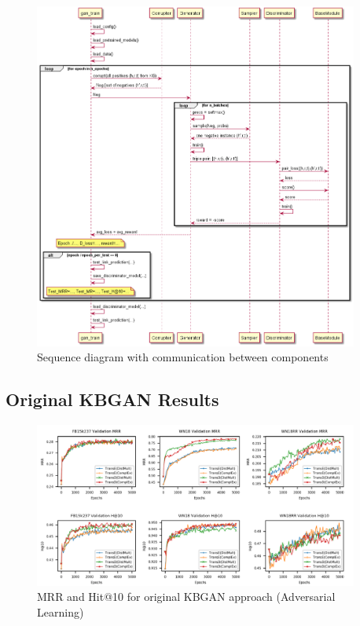 \begin{figure}[t]
  \centering
    \includegraphics[width=0.95\textwidth]{appendices/gan_train_sequencediagram.png}
  \caption{Sequence diagram with communication between components}
  \label{fig:overview}
\end{figure}


\subsection{Original KBGAN Results}
\begin{figure}[t]
  \centering
    \includegraphics[width=0.95\textwidth]{appendices/original/original_results.png}
  \caption{MRR and Hit@10 for original KBGAN approach (Adversarial Learning)}
  \label{fig:overview}
\end{figure}


